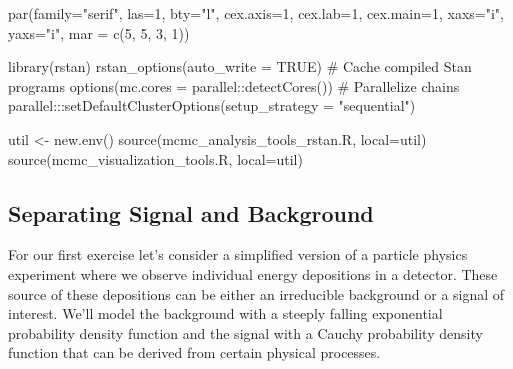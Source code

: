 \documentclass[
  letterpaper,
  DIV=11,
  numbers=noendperiod]{scrartcl}
\newenvironment{Shaded}{\begin{snugshade}}{\end{snugshade}}
\newcommand{\AttributeTok}[1]{\textcolor[rgb]{0.40,0.45,0.13}{#1}}
\newcommand{\CommentTok}[1]{\textcolor[rgb]{0.37,0.37,0.37}{#1}}
\newcommand{\ConstantTok}[1]{\textcolor[rgb]{0.56,0.35,0.01}{#1}}
\newcommand{\DecValTok}[1]{\textcolor[rgb]{0.68,0.00,0.00}{#1}}
\newcommand{\FunctionTok}[1]{\textcolor[rgb]{0.28,0.35,0.67}{#1}}
\newcommand{\NormalTok}[1]{\textcolor[rgb]{0.00,0.23,0.31}{#1}}
\newcommand{\OtherTok}[1]{\textcolor[rgb]{0.00,0.23,0.31}{#1}}
\newcommand{\SpecialCharTok}[1]{\textcolor[rgb]{0.37,0.37,0.37}{#1}}
\newcommand{\StringTok}[1]{\textcolor[rgb]{0.13,0.47,0.30}{#1}}
\begin{document}
\begin{Shaded}
\begin{Highlighting}[]
\FunctionTok{par}\NormalTok{(}\AttributeTok{family=}\StringTok{"serif"}\NormalTok{, }\AttributeTok{las=}\DecValTok{1}\NormalTok{, }\AttributeTok{bty=}\StringTok{"l"}\NormalTok{,}
    \AttributeTok{cex.axis=}\DecValTok{1}\NormalTok{, }\AttributeTok{cex.lab=}\DecValTok{1}\NormalTok{, }\AttributeTok{cex.main=}\DecValTok{1}\NormalTok{,}
    \AttributeTok{xaxs=}\StringTok{"i"}\NormalTok{, }\AttributeTok{yaxs=}\StringTok{"i"}\NormalTok{, }\AttributeTok{mar =} \FunctionTok{c}\NormalTok{(}\DecValTok{5}\NormalTok{, }\DecValTok{5}\NormalTok{, }\DecValTok{3}\NormalTok{, }\DecValTok{1}\NormalTok{))}

\FunctionTok{library}\NormalTok{(rstan)}
\FunctionTok{rstan\_options}\NormalTok{(}\AttributeTok{auto\_write =} \ConstantTok{TRUE}\NormalTok{)            }\CommentTok{\# Cache compiled Stan programs}
\FunctionTok{options}\NormalTok{(}\AttributeTok{mc.cores =}\NormalTok{ parallel}\SpecialCharTok{::}\FunctionTok{detectCores}\NormalTok{()) }\CommentTok{\# Parallelize chains}
\NormalTok{parallel}\SpecialCharTok{:::}\FunctionTok{setDefaultClusterOptions}\NormalTok{(}\AttributeTok{setup\_strategy =} \StringTok{"sequential"}\NormalTok{)}
\end{Highlighting}
\end{Shaded}

\begin{Shaded}
\begin{Highlighting}[]
\NormalTok{util }\OtherTok{\textless{}{-}} \FunctionTok{new.env}\NormalTok{()}
\FunctionTok{source}\NormalTok{(}\StringTok{\textquotesingle{}mcmc\_analysis\_tools\_rstan.R\textquotesingle{}}\NormalTok{, }\AttributeTok{local=}\NormalTok{util)}
\FunctionTok{source}\NormalTok{(}\StringTok{\textquotesingle{}mcmc\_visualization\_tools.R\textquotesingle{}}\NormalTok{, }\AttributeTok{local=}\NormalTok{util)}
\end{Highlighting}
\end{Shaded}

\subsection{Separating Signal and
Background}\label{separating-signal-and-background}

For our first exercise let's consider a simplified version of a particle
physics experiment where we observe individual energy depositions in a
detector. These source of these depositions can be either an irreducible
background or a signal of interest. We'll model the background with a
steeply falling exponential probability density function and the signal
with a Cauchy probability density function that can be derived from
certain physical processes.
\end{document}
